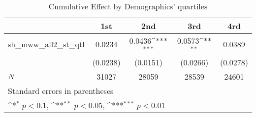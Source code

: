 \begin{table}[htbp]\centering
\def\sym#1{\ifmmode^{#1}\else\(^{#1}\)\fi}
\caption{Cumulative Effect by Demographics' quartiles}
\begin{tabular}{l*{4}{c}}
\hline\hline
            &\multicolumn{1}{c}{1st}&\multicolumn{1}{c}{2nd}&\multicolumn{1}{c}{3rd}&\multicolumn{1}{c}{4rd}\\
\hline
sh\_mww\_all2\_st\_qtl&      0.0234         &      0.0436\sym{***}&      0.0573\sym{**} &      0.0389         \\
            &    (0.0238)         &    (0.0151)         &    (0.0266)         &    (0.0278)         \\
\hline
\(N\)       &       31027         &       28059         &       28539         &       24601         \\
\hline\hline
\multicolumn{5}{l}{\footnotesize Standard errors in parentheses}\\
\multicolumn{5}{l}{\footnotesize \sym{*} \(p<0.1\), \sym{**} \(p<0.05\), \sym{***} \(p<0.01\)}\\
\end{tabular}
\end{table}
